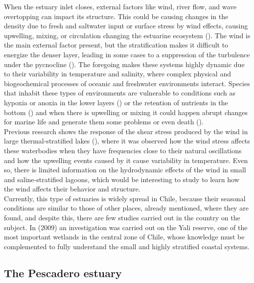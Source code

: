 \documentclass[11pt,letterpaper]{article}
\begin{document}
    When the estuary inlet closes, external factors like wind, river flow, and wave overtopping can impact its structure. This could be causing changes in the density due to fresh and saltwater input or surface stress by wind effects, causing upwelling, mixing, or circulation changing the estuarine ecosystem (\cite{Ranasinghe1999}).  The wind is the main external factor present, but the stratification makes it difficult to energize the denser layer, leading in some cases to a suppression of the turbulence under the pycnocline (\cite{Cousins2010}). The foregoing makes these systems highly dynamic due to their variability in temperature and salinity, where complex physical and biogeochemical processes of oceanic and freshwater environments interact. Species that inhabit these types of environments are vulnerable to conditions such as hypoxia or anoxia in the lower layers (\cite{Kelly2018}) or the retention of nutrients in the bottom (\cite{Cousins2010}) and when there is upwelling or mixing it could happen abrupt changes for marine life and generate them some problems or even death (\cite{marti2008relating}).\\
    
    Previous research shows the response of the shear stress produced by the wind in large thermal-stratified lakes (\cite{Coman2012, Laval2008, avalos2019natural}), where it was observed how the wind stress affects these waterbodies when they have frequencies close to their natural oscillations and how the upwelling events caused by it cause variability in temperature. Even so, there is limited information on the hydrodynamic effects of the wind in small and saline-stratified lagoons, which would be interesting to study to learn how the wind affects their behavior and structure.\\
    
    Currently, this type of estuaries is widely spread in Chile, because their seasonal conditions are similar to those of other places, already mentioned, where they are found, and despite this, there are few studies carried out in the country on the subject. In \citeauthor{dussaillant2009} (2009) an investigation was carried out on the Yali reserve, one of the most important wetlands in the central zone of Chile, whose knowledge must be complemented to fully understand the small and highly stratified coastal systems.\\
    
    \subsection{The Pescadero estuary}
\end{document}
